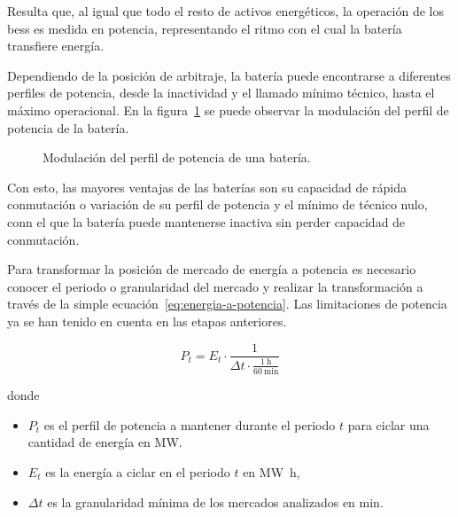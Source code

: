 Resulta que, al igual que todo el resto de activos energéticos, la operación de los \gls{bess} es medida en potencia, representando el ritmo con el cual la batería transfiere energía.

Dependiendo de la posición de arbitraje, la batería puede encontrarse a diferentes perfiles de potencia, desde la inactividad y el llamado mínimo técnico, hasta el máximo operacional. En la figura~\ref{fig:perfil-potencia} se puede observar la modulación del perfil de potencia de la batería.

\begin{figure}
  \centering
  \caption{Modulación del perfil de potencia de una batería.}
  \label{fig:perfil-potencia}
\end{figure}

Con esto, las mayores ventajas de las baterías son su capacidad de rápida conmutación o variación de su perfil de potencia y el mínimo de técnico nulo, conn el que la batería puede mantenerse inactiva sin perder capacidad de conmutación.

Para transformar la posición de mercado de energía a potencia es necesario conocer el periodo o granularidad del mercado y realizar la transformación a través de la simple ecuación~\ref{eq:energia-a-potencia}. Las limitaciones de potencia ya se han tenido en cuenta en las etapas anteriores.

\begin{equation}
  \label{eq:energia-a-potencia}
  P_{t} = E_{t} \cdot \frac{1}{\Delta t \cdot \frac{\SI{1}{\hour}}{\SI{60}{\minute}}}
\end{equation}

donde

\begin{itemize}

  \item \( P_{t} \) es el perfil de potencia a mantener durante el periodo \( t \) para ciclar una cantidad de energía en \si{\mega\watt}.

  \item \( E_{t} \) es la energía a ciclar en el periodo \( t \) en \si{{\mega\watt\hour}},

  \item \( \Delta t \) es la granularidad mínima de los mercados analizados en \si{\minute}.

\end{itemize}

